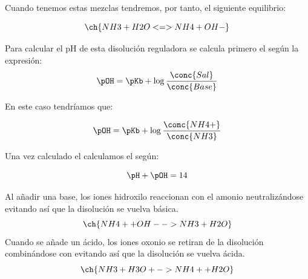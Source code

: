 \begin{enumerate}[label=\numberballmDarkTeal]
        Cuando tenemos estas mezclas tendremos, por tanto, el siguiente equilibrio:

        \begin{equation*}
            \ch{NH3 + H2O <=> NH4 + OH-}
        \end{equation*}

        Para calcular el pH de esta disolución reguladora se calcula primero el \pOH{} según la expresión:
        \begin{equation*}
            \pOH = \pKb + \log\dfrac{\conc{Sal}}{\conc{Base}}
        \end{equation*}

        En este caso tendríamos que:

        \begin{equation*}
            \pOH = \pKb + \log\dfrac{\conc{NH4+}}{\conc{NH3}}
        \end{equation*}

        Una vez calculado el \pOH{} calculamos el \pH{} según:

        \begin{equation*}
            \pH + \pOH = 14
        \end{equation*}

        Al añadir una base, los iones hidroxilo reaccionan con el amonio neutralizándose evitando así que la disolución se vuelva básica.
        \begin{equation*}
            \ch{NH4+ + OH- -> NH3 + H2O}
        \end{equation*}
        Cuando se añade un ácido, los iones oxonio se retiran de la disolución combinándose con  evitando así que la disolución se vuelva ácida.
        \begin{equation*}
            \ch{NH3 + H3O+ -> NH4+ + H2O}
        \end{equation*}
    \end{enumerate}


